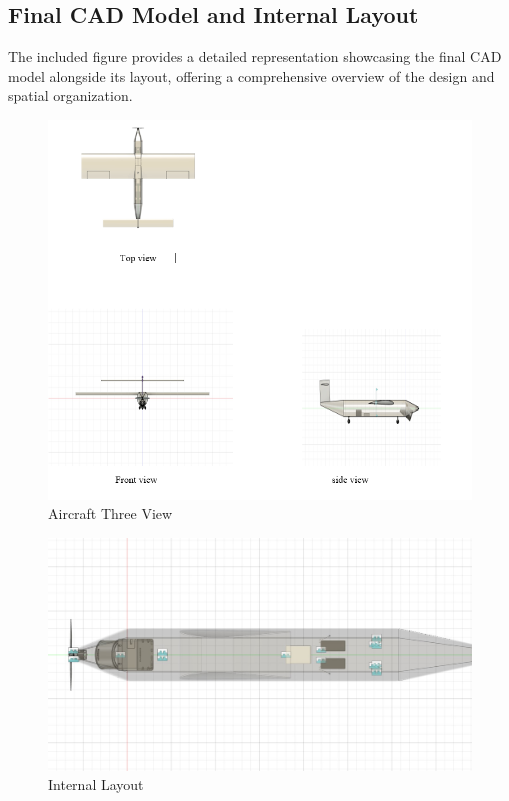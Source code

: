\documentclass[12 pt]{article}
\begin{document}
{{\subsection{Final CAD Model and Internal Layout}

The included figure provides a detailed representation showcasing the final CAD model alongside its layout, offering a comprehensive overview of the design and spatial organization.



\begin{figure}[h]
    \centering
    \includegraphics[width=1.16\linewidth]{3d view.png}
    \caption{Aircraft Three View}
    \label{fig:enter-label}
\end{figure}

\newpage

   
\begin{figure}
        \centering
        \includegraphics[width=1.10\linewidth]{iso view .jpeg}
        \caption{Internal Layout}
        \label{fig:enter-label}
    \end{figure}



}}
\end{document}

